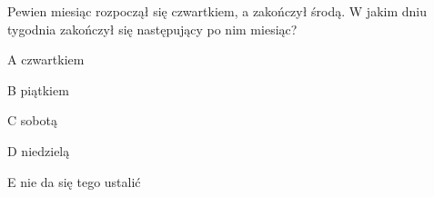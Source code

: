\begin{tresc}
Pewien miesiąc rozpoczął się czwartkiem, a zakończył środą. W jakim dniu tygodnia zakończył się następujący po nim miesiąc?
\end{tresc}
\begin{wariant}{A} czwartkiem \end{wariant}
\begin{wariant}{B} piątkiem \end{wariant}
\begin{wariant}{C} sobotą \end{wariant}
\begin{wariant}{D} niedzielą \end{wariant}
\begin{wariant}{E} nie da się tego ustalić \end{wariant}
